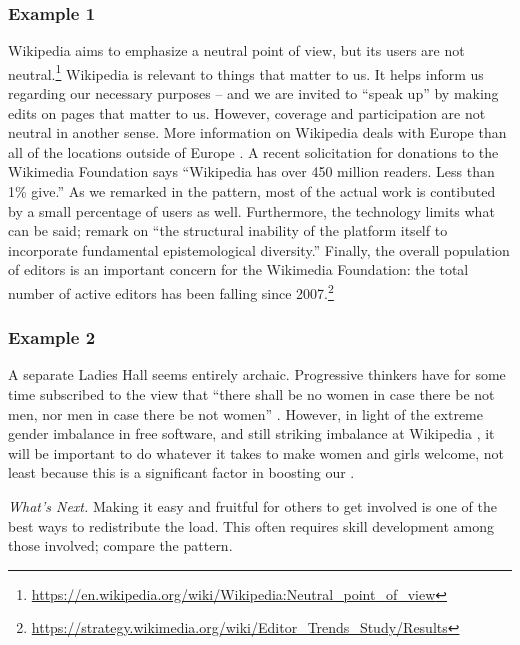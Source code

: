 \subsubsection*{Example 1}
Wikipedia aims to emphasize a neutral point of view, but its users are
not neutral.\footnote{\url{https://en.wikipedia.org/wiki/Wikipedia:Neutral_point_of_view}}
Wikipedia is relevant to things that matter to us.  It
helps inform us regarding our necessary purposes -- and we are invited
to ``speak up'' by making edits on pages that matter to us.  However,
coverage and participation are not neutral in another sense.
More information on Wikipedia deals with Europe than
all of the locations outside of Europe \cite{graham2014uneven}.
A recent solicitation for donations to the Wikimedia Foundation
says ``Wikipedia has over 450 million readers.  Less than 1\% give.''
%
As we remarked in the  pattern, most of the
actual work is contibuted by a small percentage of users as well.
%
Furthermore, the technology limits what can be said; 
\cite{graham2014uneven} remark on
``the structural inability of the platform itself to incorporate fundamental epistemological diversity.''
%
Finally, the overall population of editors is an important concern for
the Wikimedia Foundation: the total number of active editors has been
falling since
2007.\footnote{\url{https://strategy.wikimedia.org/wiki/Editor_Trends_Study/Results}}

\subsubsection*{Example 2}
A separate Ladies Hall seems entirely archaic.  Progressive thinkers have for
some time subscribed to the view that ``there shall be no women in
case there be not men, nor men in case there be not women''
\cite[Chapter 1.LII]{rabelais1894gargantua}.  However, in light of the
extreme gender imbalance in free software, and still striking
imbalance at Wikipedia \cite{gender,FM4291}, it will be important to
do whatever it takes to make women and girls welcome, not least
because this is a significant factor in boosting our
.


\begin{framed}
\noindent 
\emph{What's Next.}  Making it easy and fruitful for others to get involved is one of the best ways to redistribute the load.  This often requires skill development among those involved; compare the  pattern.
\end{framed}



  
